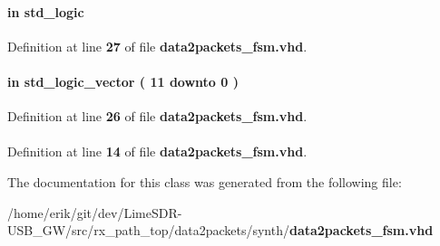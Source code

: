 \paragraph[{smpl\+\_\+buff\+\_\+rdy}]{ {\bfseries \textcolor{keywordflow}{in}\textcolor{vhdlchar}{ }} {\bfseries \textcolor{comment}{std\+\_\+logic}\textcolor{vhdlchar}{ }} \hspace{0.3cm}{\ttfamily [Port]}}\label{classdata2packets__fsm_a20739049723d6879e70979f3a0e8f779}


Definition at line {\bf 27} of file {\bf data2packets\+\_\+fsm.\+vhd}.

\paragraph[{smpl\+\_\+rd\+\_\+size}]{ {\bfseries \textcolor{keywordflow}{in}\textcolor{vhdlchar}{ }} {\bfseries \textcolor{comment}{std\+\_\+logic\+\_\+vector}\textcolor{vhdlchar}{ }\textcolor{vhdlchar}{(}\textcolor{vhdlchar}{ }\textcolor{vhdlchar}{ } \textcolor{vhdldigit}{11} \textcolor{vhdlchar}{ }\textcolor{keywordflow}{downto}\textcolor{vhdlchar}{ }\textcolor{vhdlchar}{ } \textcolor{vhdldigit}{0} \textcolor{vhdlchar}{ }\textcolor{vhdlchar}{)}\textcolor{vhdlchar}{ }} \hspace{0.3cm}{\ttfamily [Port]}}\label{classdata2packets__fsm_aa8a3335ab92d6235c29c4c33e4c9f440}


Definition at line {\bf 26} of file {\bf data2packets\+\_\+fsm.\+vhd}.

\paragraph[{std\+\_\+logic\+\_\+1164}]{\hspace{0.3cm}{\ttfamily [Package]}}\label{classdata2packets__fsm_acd03516902501cd1c7296a98e22c6fcb}


Definition at line {\bf 14} of file {\bf data2packets\+\_\+fsm.\+vhd}.



The documentation for this class was generated from the following file\+:\begin{DoxyCompactItemize}
\item 
/home/erik/git/dev/\+Lime\+S\+D\+R-\/\+U\+S\+B\+\_\+\+G\+W/src/rx\+\_\+path\+\_\+top/data2packets/synth/{\bf data2packets\+\_\+fsm.\+vhd}\end{DoxyCompactItemize}
